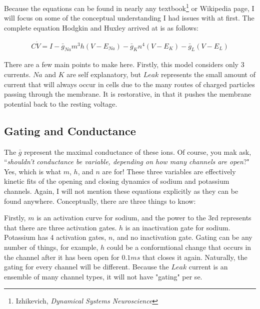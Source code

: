 Because the equations can be found in nearly any textbook\footnote{Izhikevich, \textit{Dynamical Systems Neuroscience}} or Wikipedia page, I will focus on some of the conceptual understanding I had issues with at first. The complete equation Hodgkin and Huxley arrived at is as follows: 

\bigskip

\begin{equation} \label{hh2}
\begin{split}
C\dot{V} = I - \bar{g}_{Na}m^3h(V - E_{Na}) - \bar{g}_{K}n^4(V - E_{K}) - \bar{g}_{L}(V - E_{L})
\end{split}
\end{equation}

\bigskip 

There are a few main points to make here. Firstly, this model considers only 3 currents. $Na$ and $K$ are self explanatory, but $Leak$ represents the small amount of current that will always occur in cells due to the many routes of charged particles passing through the membrane. It is restorative, in that it pushes the membrane potential back to the resting voltage.\newline

\subsection{Gating and Conductance} 

\label{sec:GatingandConductance}

The $\bar{g}$ represent the maximal conductance of these ions. Of course, you mak ask, ``\textit{shouldn't conductance be variable, depending on how many channels are open}?" Yes, which is what $m$, $h$, and $n$ are for! These three variables are effectively kinetic fits of the opening and closing dynamics of sodium and potassium channels. Again, I will not mention these equations explicitly as they can be found anywhere. Conceptually, there are three things to know:\newline

Firstly, $m$ is an activation curve for sodium, and the power to the 3rd represents that there are three activation gates. $h$ is an inactivation gate for sodium. Potassium has 4 activation gates, $n$, and no inactivation gate. Gating can be any number of things, for example, $h$ could be a conformtional change that occurs in the channel after it has been open for $0.1 ms$ that closes it again. Naturally, the gating for every channel will be different. Because the $Leak$ current is an ensemble of many channel types, it will not have "gating" per se.\newline

